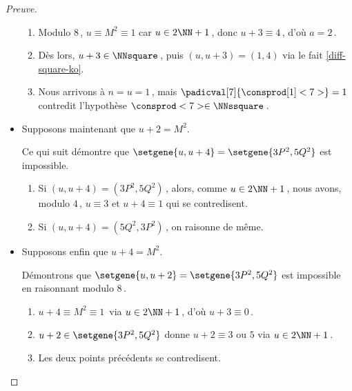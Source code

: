 \begin{proof}[Preuve]
\begin{itemize}
\begin{enumerate}
			\item Modulo $8$\,, $u \equiv M^2 \equiv 1$ car $u \in 2 \NN + 1$\,,
			donc $u + 3 \equiv 4$\,, d'où $a = 2$\,.

			\item Dès lors, $u + 3 \in \NNsquare$\,, puis $(u, u + 3) = (1, 4)$ via le fait \ref{diff-square-ko}.

			\item Nous arrivons à $n = u = 1$\,, mais $\padicval[7]{\consprod[1]<7>} = 1$ contredit l'hypothèse $\consprod<7> \in \NNssquare$\,.
		\end{enumerate}


    	\item Supposons maintenant que $u + 2 = M^2$.

		\smallskip
		\noindent
		Ce qui suit démontre que $\setgene{u, u + 4} = \setgene{3P^2, 5Q^2}$ est impossible.
		\begin{enumerate}
			\item Si $(u, u + 4) = (3P^2, 5Q^2)$\,, alors,
			comme $u \in 2 \NN + 1$\,, nous avons, modulo $4$\,,
			$u \equiv 3$
			et
			$u+4 \equiv 1$
			qui se contredisent.

			\item Si $(u, u + 4) = (5Q^2, 3P^2)$\,, on raisonne de même.
		\end{enumerate}


    	\item Supposons enfin que $u + 4 = M^2$.

		\smallskip
		\noindent
		Démontrons que $\setgene{u, u + 2} = \setgene{3P^2, 5Q^2}$ est impossible en raisonnant modulo $8$\,.
		\begin{enumerate}
			\item $u + 4 \equiv M^2 \equiv 1$\, via $u \in 2 \NN + 1$\,,
			d'où $u + 3 \equiv 0$\,.

			\item $u + 2 \in \setgene{3P^2, 5Q^2}$ donne $u + 2 \equiv \text{$3$ ou $5$}$  via $u \in 2 \NN + 1$\,.

			\item Les deux points précédents se contredisent.
		\end{enumerate}
    \end{itemize}
\end{proof}

 
